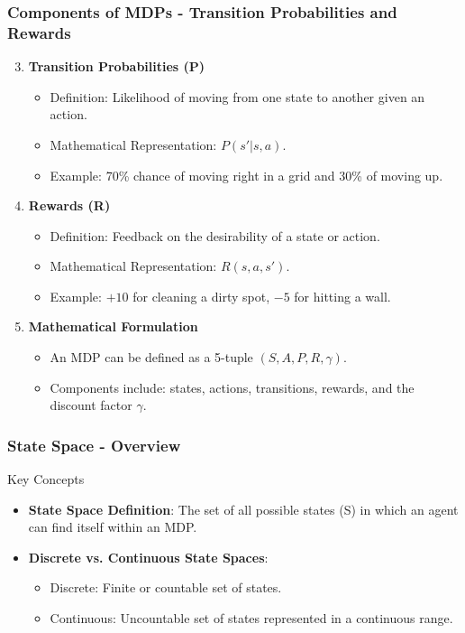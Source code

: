 \documentclass[aspectratio=169]{beamer}
\begin{document}
\begin{frame}[fragile]
    \frametitle{Components of MDPs - Transition Probabilities and Rewards}
    \begin{enumerate}
        \setcounter{enumi}{2}
        \item \textbf{Transition Probabilities (P)}
        \begin{itemize}
            \item Definition: Likelihood of moving from one state to another given an action.
            \item Mathematical Representation: $P(s'|s,a)$.
            \item Example: 70\% chance of moving right in a grid and 30\% of moving up.
        \end{itemize}

        \item \textbf{Rewards (R)}
        \begin{itemize}
            \item Definition: Feedback on the desirability of a state or action.
            \item Mathematical Representation: $R(s,a,s')$.
            \item Example: $+10$ for cleaning a dirty spot, $-5$ for hitting a wall. 
        \end{itemize}

        \item \textbf{Mathematical Formulation}
        \begin{itemize}
            \item An MDP can be defined as a 5-tuple $(S, A, P, R, \gamma)$.
            \item Components include: states, actions, transitions, rewards, and the discount factor $\gamma$.
        \end{itemize}
    \end{enumerate}
\end{frame}

\begin{frame}[fragile]
    \frametitle{State Space - Overview}
    \begin{block}{Key Concepts}
        \begin{itemize}
            \item \textbf{State Space Definition}: The set of all possible states (S) in which an agent can find itself within an MDP.
            \item \textbf{Discrete vs. Continuous State Spaces}:
                \begin{itemize}
                    \item Discrete: Finite or countable set of states.
                    \item Continuous: Uncountable set of states represented in a continuous range.
                \end{itemize}
        \end{itemize}
    \end{block}
\end{frame}
\end{document}
